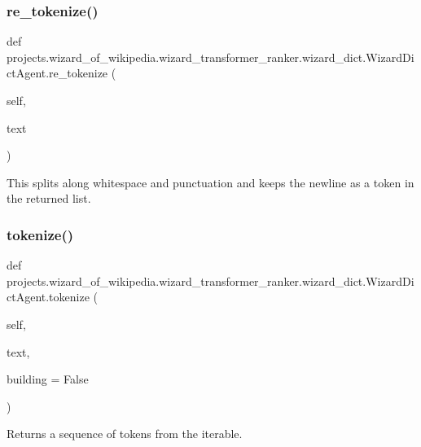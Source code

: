 \subsubsection{\texorpdfstring{re\+\_\+tokenize()}{re\_tokenize()}}
{\footnotesize\ttfamily def projects.\+wizard\+\_\+of\+\_\+wikipedia.\+wizard\+\_\+transformer\+\_\+ranker.\+wizard\+\_\+dict.\+Wizard\+Dict\+Agent.\+re\+\_\+tokenize (\begin{DoxyParamCaption}\item[{}]{self,  }\item[{}]{text }\end{DoxyParamCaption})}

\begin{DoxyVerb}This splits along whitespace and punctuation and keeps the newline as a token in
the returned list.
\end{DoxyVerb}
 \mbox{\label{classprojects_1_1wizard__of__wikipedia_1_1wizard__transformer__ranker_1_1wizard__dict_1_1WizardDictAgent_a314852ee65380b494e078d51d73c0767}} 
\subsubsection{\texorpdfstring{tokenize()}{tokenize()}}
{\footnotesize\ttfamily def projects.\+wizard\+\_\+of\+\_\+wikipedia.\+wizard\+\_\+transformer\+\_\+ranker.\+wizard\+\_\+dict.\+Wizard\+Dict\+Agent.\+tokenize (\begin{DoxyParamCaption}\item[{}]{self,  }\item[{}]{text,  }\item[{}]{building = {\ttfamily False} }\end{DoxyParamCaption})}

\begin{DoxyVerb}Returns a sequence of tokens from the iterable.
\end{DoxyVerb}
 

